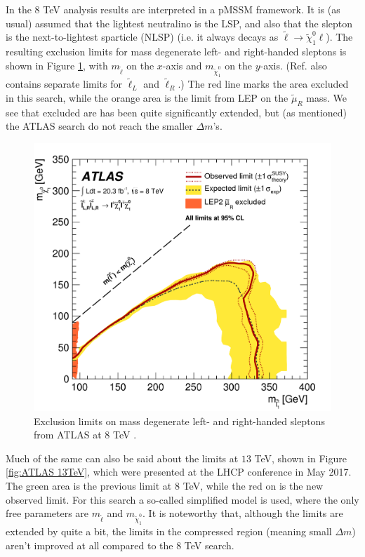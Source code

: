 \documentclass[twocolumn,a4paper,10pt]{article}
\begin{document}
In the $8$ TeV analysis results are interpreted in a pMSSM framework. It is (as usual) assumed that 
the lightest neutralino is the LSP, and also that the slepton is the next-to-lightest sparticle (NLSP) 
(i.e. it always decays as $\tilde{\ell}\rightarrow \tilde{\chi}_1^0 \ell$). The resulting exclusion 
limits for mass degenerate left- and right-handed sleptons is shown in Figure \ref{fig:ATLAS 8TeV}, 
with $m_{\tilde{\ell}}$ on the $x$-axis and $m_{\tilde{\chi}_1^0}$ on the $y$-axis.  
(Ref. \cite{ATLAS:2014} also contains separate limits for $\tilde{\ell}_L$ and $\tilde{\ell}_R$.)   
The red line marks the area excluded in this search, while the orange area is the limit from 
LEP on the $\tilde{\mu}_R$ mass. We see that excluded are has been quite significantly extended, but 
(as mentioned) the ATLAS search do not reach the smaller $\Delta m$'s.

\begin{figure}
\begin{center}
\includegraphics[scale=0.1]{Run1exclusion.png}
\caption{Exclusion limits on mass degenerate left- and right-handed sleptons from ATLAS at 
$8$ TeV \cite{ATLAS:2014}.}
\label{fig:ATLAS 8TeV}
\end{center}
\end{figure}  

Much of the same can also be said about the limits at $13$ TeV, shown in Figure \ref{fig:ATLAS 13TeV}, 
which were presented at the LHCP conference in May 2017. The green area is the previous limit at $8$ 
TeV, while the red on is the new observed limit. For this search a so-called simplified model is used, 
where the only free parameters are $m_{\tilde{\ell}}$ and $m_{\tilde{\chi}_1^0}$. It is noteworthy 
that, although the limits are extended by quite a bit, the limits in the compressed region (meaning 
small $\Delta m$) aren't improved at all compared to the $8$ TeV search.        
\end{document}
